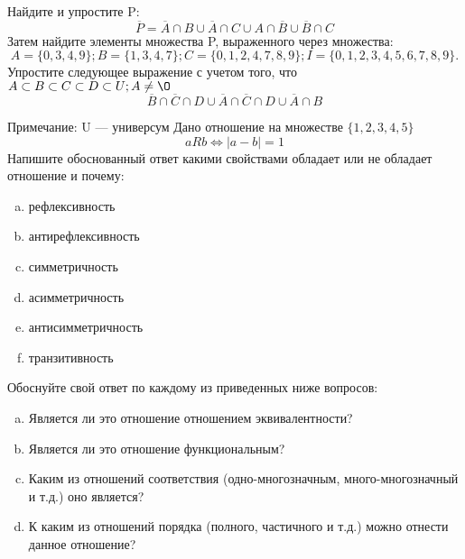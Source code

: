 \documentclass[10pt]{exam}
\begin{document}
\begin{questions}
\question
Найдите и упростите P:
\begin{equation*}
\overline{P} = \overline{A} \cap B \cup \overline{A} \cap C \cup A \cap \overline{B} \cup \overline{B} \cap C
\end{equation*}
Затем найдите элементы множества P, выраженного через множества:
\begin{equation*}
A = \{0, 3, 4, 9\}; 
B = \{1, 3, 4, 7\};
C = \{0, 1, 2, 4, 7, 8, 9\};
I = \{0, 1, 2, 3, 4, 5, 6, 7, 8, 9\}.
\end{equation*}\question
Упростите следующее выражение с учетом того, что $A\subset B \subset C \subset D \subset U; A \neq \O$
\begin{equation*}
\overline{B} \cap \overline{C} \cap D \cup \overline{A} \cap \overline{C} \cap D \cup \overline{A} \cap B
\end{equation*}

Примечание: U — универсум\question
Дано отношение на множестве $\{1, 2, 3, 4, 5\}$ 
\begin{equation*}
aRb \iff |a-b| = 1
\end{equation*}
Напишите обоснованный ответ какими свойствами обладает или не обладает отношение и почему:   
\begin{enumerate} [a)]\setcounter{enumi}{0}
\item рефлексивность
\item антирефлексивность
\item симметричность
\item асимметричность
\item антисимметричность
\item транзитивность
\end{enumerate}

Обоснуйте свой ответ по каждому из приведенных ниже вопросов:
\begin{enumerate} [a)]\setcounter{enumi}{0}
    \item Является ли это отношение отношением эквивалентности?
    \item Является ли это отношение функциональным?
    \item Каким из отношений соответствия (одно-многозначным, много-многозначный и т.д.) оно является?
    \item К каким из отношений порядка (полного, частичного и т.д.) можно отнести данное отношение?
\end{enumerate}


\end{questions}
\end{document}

